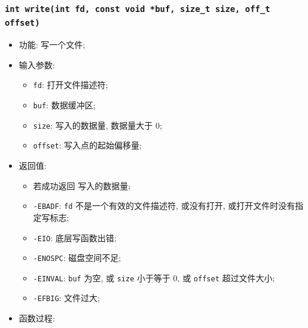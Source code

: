 \documentclass[nofonts]{ctexart}
\begin{document}
  \subsubsection{\texttt{int write(int fd, const void *buf, size\_t size, off\_t offset)}}
  \begin{itemize}
\item
  功能: 写一个文件;
\item
  输入参数:

  \begin{itemize}
  \item
    \texttt{fd}: 打开文件描述符;
  \item
    \texttt{buf}: 数据缓冲区;
  \item
    \texttt{size}: 写入的数据量, 数据量大于 0;
  \item
    \texttt{offset}: 写入点的起始偏移量;
  \end{itemize}
\item
  返回值:

  \begin{itemize}
  \item
    若成功返回 写入的数据量;
  \item
    \texttt{-EBADF}: \texttt{fd} 不是一个有效的文件描述符, 或没有打开,
    或打开文件时没有指定写标志;
  \item
    \texttt{-EIO}: 底层写函数出错;
  \item
    \texttt{-ENOSPC}: 磁盘空间不足;
  \item
    \texttt{-EINVAL}: \texttt{buf} 为空, 或 \texttt{size} 小于等于 0, 或
    \texttt{offset} 超过文件大小;
  \item
    \texttt{-EFBIG}: 文件过大;
  \end{itemize}
\item
  函数过程:


\end{itemize}
\end{document}
